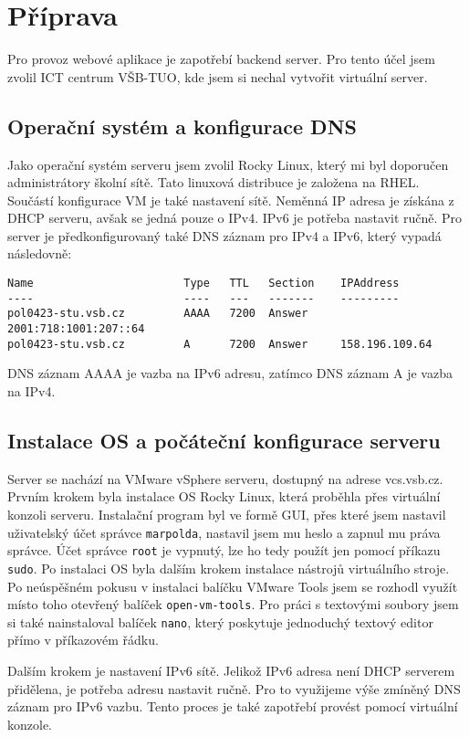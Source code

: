 \chapter{Příprava}
Pro provoz webové aplikace je zapotřebí backend server.
Pro tento účel jsem zvolil ICT centrum VŠB-TUO, kde jsem si nechal
vytvořit virtuální server.

\section{Operační systém a konfigurace DNS}
Jako operační systém serveru jsem zvolil Rocky Linux,
který mi byl doporučen administrátory školní sítě. Tato linuxová
distribuce je založena na RHEL. Součástí konfigurace VM je také
nastavení sítě. Neměnná IP adresa je získána z DHCP serveru,
avšak se jedná pouze o IPv4. IPv6 je potřeba nastavit ručně.
Pro server je předkonfigurovaný také DNS záznam pro IPv4 a IPv6,
který vypadá následovně:

\begin{verbatim}
Name                       Type   TTL   Section    IPAddress
----                       ----   ---   -------    ---------
pol0423-stu.vsb.cz         AAAA   7200  Answer     2001:718:1001:207::64
pol0423-stu.vsb.cz         A      7200  Answer     158.196.109.64
\end{verbatim}

DNS záznam AAAA je vazba na IPv6 adresu, zatímco DNS záznam A
je vazba na IPv4.

\section{Instalace OS a počáteční konfigurace serveru}
Server se nachází na VMware vSphere serveru, dostupný
na adrese vcs.vsb.cz. Prvním krokem byla instalace OS Rocky Linux,
která proběhla přes virtuální konzoli serveru. Instalační program
byl ve formě GUI, přes které jsem nastavil uživatelský účet správce
\texttt{marpolda}, nastavil jsem mu heslo a zapnul mu práva správce.
Účet správce \texttt{root} je vypnutý, lze ho tedy použít jen pomocí
příkazu \texttt{sudo}. Po instalaci OS byla dalším krokem instalace
nástrojů virtuálního stroje. Po neúspěšném pokusu v instalaci balíčku
VMware Tools jsem se rozhodl využít místo toho otevřený balíček
\texttt{open-vm-tools}. Pro práci s textovými soubory jsem si
také nainstaloval balíček \texttt{nano}, který poskytuje jednoduchý
textový editor přímo v příkazovém řádku.

Dalším krokem je nastavení IPv6 sítě. Jelikož IPv6 adresa není
DHCP serverem přidělena, je potřeba adresu nastavit ručně. Pro to
využijeme výše zmíněný DNS záznam pro IPv6 vazbu. Tento proces
je také zapotřebí provést pomocí virtuální konzole.

